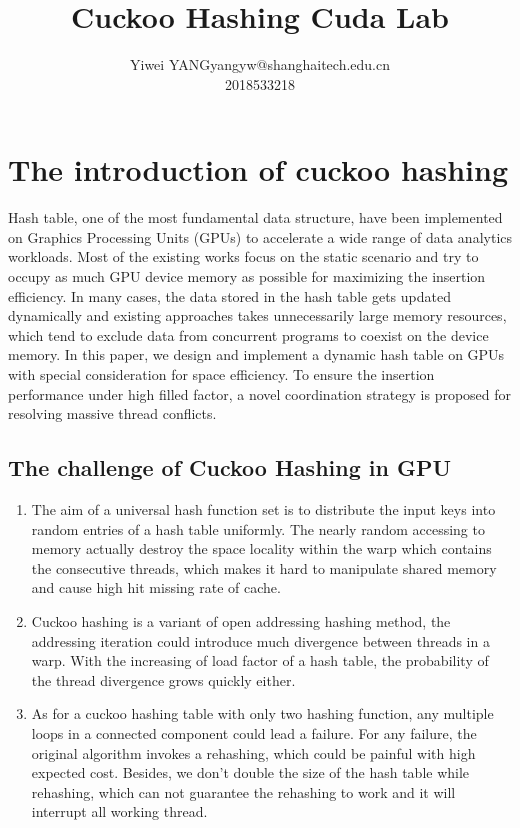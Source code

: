 \documentclass[twoside,11pt]{article}
\makeatletter
\newcommand\studentName{Yiwei YANG}                  %
\newcommand\studentEmail{yangyw@shanghaitech.edu.cn}          %
\newcommand\studentNumber{2018533218}                %
\makeatother
\begin{document}
    
    \title{Cuckoo Hashing Cuda Lab}
    
    \author{\name \studentName \email \studentEmail \\
    \studentNumber
    \addr
    }
    
    \maketitle
                                                                                       


\section{The introduction of cuckoo hashing}

Hash table, one of the most fundamental data structure, have been implemented on Graphics Processing Units (GPUs) to accelerate a wide range of data analytics workloads. Most of the existing works focus on the static scenario and try to occupy as much GPU device memory as possible for maximizing the insertion efficiency. In many cases, the data stored in the hash table gets updated dynamically and existing approaches takes unnecessarily large memory resources, which tend to exclude data from concurrent programs to coexist on the device memory. In this paper, we design and implement a dynamic hash table on GPUs with special consideration for space efficiency. To ensure the insertion performance under high filled factor, a novel coordination strategy is proposed for resolving massive thread conflicts.
\subsection{The challenge of Cuckoo Hashing in GPU}
\begin{enumerate}
    \item The aim of a universal hash function set is to distribute the input keys into random entries of a hash table uniformly. The nearly random accessing to memory actually destroy the space locality within the warp which contains the consecutive threads, which makes it hard to manipulate shared memory and cause high hit missing rate of cache.
    \item Cuckoo hashing is a variant of open addressing hashing method, the addressing iteration could introduce much divergence between threads in a warp. With the increasing of load factor of a hash table, the probability of the thread divergence grows quickly either.
    \item As for a cuckoo hashing table with only two hashing function, any multiple loops in a connected component could lead a failure. For any failure, the original algorithm invokes a rehashing, which could be painful with high expected cost. Besides, we don't double the size of the hash table while rehashing, which can not guarantee the rehashing to work and it will interrupt all working thread.
\end{enumerate}
\end{document}
